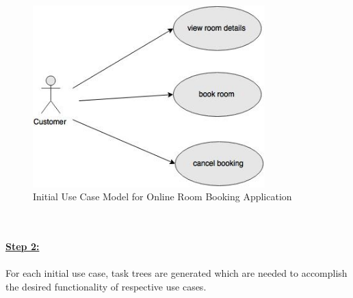 \begin{figure}[H]
\begin{center}
\includegraphics[width=0.8\textwidth]{figures/use-case-two}
\caption{Initial Use Case Model for Online Room Booking Application}
\label{fig:selection_by_use_case/use_case_two}
\end{center}
\end{figure}
\\
\\
\textbf{\underline{Step 2:}}
\\
\\
For each initial use case, task trees are generated which are needed to accomplish the desired functionality of respective use cases.
\\

